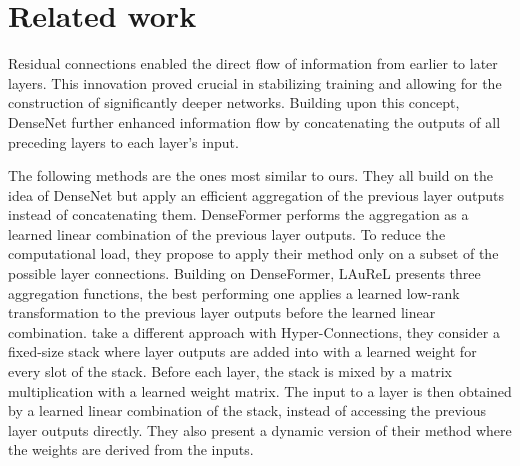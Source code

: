 \section{Related work}
\label{sec:related_work}

Residual connections \citep{he2016deep} enabled the direct flow of information from earlier to later layers. This innovation proved crucial in stabilizing training and allowing for the construction of significantly deeper networks. Building upon this concept, DenseNet \citep{huang2017densely} further enhanced information flow by concatenating the outputs of all preceding layers to each layer's input.

The following methods are the ones most similar to ours. They all build on the idea of DenseNet but apply an efficient aggregation of the previous layer outputs instead of concatenating them. DenseFormer \citep{pagliardini2024denseformer} performs the aggregation as a learned linear combination of the previous layer outputs. To reduce the computational load, they propose to apply their method only on a subset of the possible layer connections. Building on DenseFormer, LAuReL \citep{menghani2024laurel} presents three aggregation functions, the best performing one applies a learned low-rank transformation to the previous layer outputs before the learned linear combination. \citet{zhu2024hyper} take a different approach with Hyper-Connections, they consider a fixed-size stack where layer outputs are added into with a learned weight for every slot of the stack. Before each layer, the stack is mixed by a matrix multiplication with a learned weight matrix. The input to a layer is then obtained by a learned linear combination of the stack, instead of accessing the previous layer outputs directly. They also present a dynamic version of their method where the weights are derived from the inputs.


